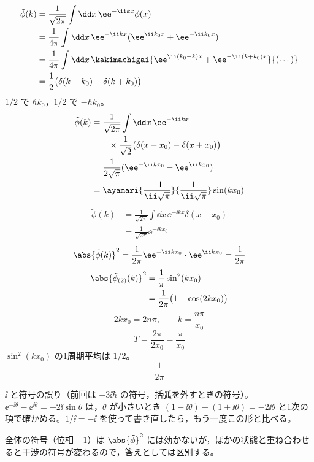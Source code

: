 \begin{align*}
\tilde{\phi}(k)&=\frac{1}{\sqrt{2\pi}}\int\dd x\,\ee^{-\ii kx}\phi(x)\\
&=\frac{1}{4\pi}\int\dd x\,\ee^{-\ii kx}(\ee^{\ii k_{0}x}+\ee^{-\ii k_{0}x})\\
&=\frac{1}{4\pi}\int\dd x\,\kakimachigai{\ee^{\ii(k_{0}-k)x}+\ee^{-\ii(k+k_{0})x}}{(\cdots)}\\
&=\frac{1}{2}\bigl(\delta(k-k_{0})+\delta(k+k_{0})\bigr)
\end{align*}
$1/2$ で $\hbar k_{0}$，$1/2$ で $-\hbar k_{0}$。
\begin{align*}
\tilde{\phi}(k)&=\frac{1}{\sqrt{2\pi}}\int\dd x\,\ee^{-\ii kx}\\
&\qquad\times\frac{1}{\sqrt{2}}\bigl(\delta(x-x_{0})-\delta(x+x_{0})\bigr)\\
&=\frac{1}{2\sqrt{\pi}}(\ee^{-\ii kx_{0}}-\ee^{\ii kx_{0}})\\
&=\ayamari{\frac{-1}{\ii\sqrt{\pi}}}{\frac{1}{\ii\sqrt{\pi}}}\sin(kx_{0})
\end{align*}
\begin{align*}
\tilde{\phi}(k)&=\frac{1}{\sqrt{2\pi}}\int\dd x\,\ee^{-\ii kx}\delta(x-x_{0})\\
&=\frac{1}{\sqrt{2\pi}}\ee^{-\ii kx_{0}}
\end{align*}
\[ \abs{\tilde{\phi}(k)}^{2}=\frac{1}{2\pi}\ee^{-\ii kx_{0}}\cdot\ee^{\ii kx_{0}}=\frac{1}{2\pi} \]
\begin{align*}
\abs{\tilde{\phi}_{(2)}(k)}^{2}&=\frac{1}{\pi}\sin^{2}(kx_{0})\\
&=\frac{1}{2\pi}\bigl(1-\cos(2kx_{0})\bigr)
\end{align*}
\[ 2kx_{0}=2n\pi,\qquad k=\frac{n\pi}{x_{0}} \]
\[ T=\frac{2\pi}{2x_{0}}=\frac{\pi}{x_{0}} \]
$\sin^{2}(kx_{0})$ の1周期平均は $1/2$。
\[ \frac{1}{2\pi} \]
\item {} $\ii$ と符号の誤り（前回は $-3\ii\hbar$ の符号，括弧を外すときの符号）。$\ee^{-\ii\theta}-\ee^{\ii\theta}=-2\ii\sin\theta$ は，$\theta$ が小さいとき $(1-\ii\theta)-(1+\ii\theta)=-2\ii\theta$ と1次の項で確かめる。$1/\ii=-\ii$ を使って書き直したら，もう一度この形と比べる。
\item 全体の符号（位相 $-1$）は $\abs{\tilde{\phi}}^{2}$ には効かないが，ほかの状態と重ね合わせると干渉の符号が変わるので，答えとしては区別する。
